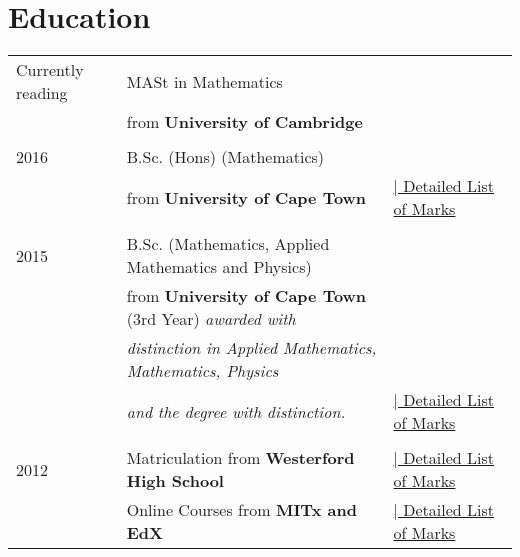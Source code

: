 
\section{Education}

\begin{tabular}{R{3cm}|ll}
  Currently reading& MASt in Mathematics&\\ &\hspace{20pt}from \textbf{University of Cambridge} &\\
                &&\\
  2016& B.Sc. (Hons) (Mathematics)&\\ &\hspace{20pt}from \textbf{University of Cape Town} &\hyperlink{hongrds}{\hfill | \footnotesize Detailed List of Marks}\\
                &&\\
  2015& B.Sc. (Mathematics, Applied Mathematics and Physics)&\\ 
      &\hspace{20pt}from \textbf{University of Cape Town} (3rd Year) \emph{awarded with}&\\
      &\hspace{20pt}\emph{distinction in Applied Mathematics, Mathematics, Physics}&\\
      &\hspace{20pt}\emph{and the degree with distinction. }&\hyperlink{unigrds}{\hfill | \footnotesize Detailed List of Marks}\\
&&\\
  2012 & Matriculation from \textbf{Westerford High School}&\hyperlink{matgrds}{\hfill | \footnotesize Detailed List of Marks}\\
& Online Courses from \textbf{MITx and EdX} &\hyperlink{ongrds}{\hfill | \footnotesize Detailed List of Marks}\\
\end{tabular}

